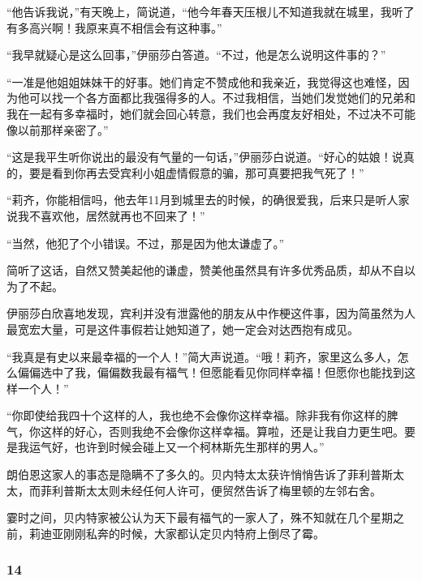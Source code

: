 \par “他告诉我说，”有天晚上，简说道，“他今年春天压根儿不知道我就在城里，我听了有多高兴啊！我原来真不相信会有这种事。”
\par “我早就疑心是这么回事，”伊丽莎白答道。“不过，他是怎么说明这件事的？”
\par “一准是他姐姐妹妹干的好事。她们肯定不赞成他和我亲近，我觉得这也难怪，因为他可以找一个各方面都比我强得多的人。不过我相信，当她们发觉她们的兄弟和我在一起有多幸福时，她们就会回心转意，我们也会再度友好相处，不过决不可能像以前那样亲密了。”
\par “这是我平生听你说出的最没有气量的一句话，”伊丽莎白说道。“好心的姑娘！说真的，要是看到你再去受宾利小姐虚情假意的骗，那可真要把我气死了！”
\par “莉齐，你能相信吗，他去年11月到城里去的时候，的确很爱我，后来只是听人家说我不喜欢他，居然就再也不回来了！”
\par “当然，他犯了个小错误。不过，那是因为他太谦虚了。”
\par 简听了这话，自然又赞美起他的谦虚，赞美他虽然具有许多优秀品质，却从不自以为了不起。
\par 伊丽莎白欣喜地发现，宾利并没有泄露他的朋友从中作梗这件事，因为简虽然为人最宽宏大量，可是这件事假若让她知道了，她一定会对达西抱有成见。
\par “我真是有史以来最幸福的一个人！”简大声说道。“哦！莉齐，家里这么多人，怎么偏偏选中了我，偏偏数我最有福气！但愿能看见你同样幸福！但愿你也能找到这样一个人！”
\par “你即使给我四十个这样的人，我也绝不会像你这样幸福。除非我有你这样的脾气，你这样的好心，否则我绝不会像你这样幸福。算啦，还是让我自力更生吧。要是我运气好，也许到时候会碰上又一个柯林斯先生那样的男人。”
\par 朗伯恩这家人的事态是隐瞒不了多久的。贝内特太太获许悄悄告诉了菲利普斯太太，而菲利普斯太太则未经任何人许可，便贸然告诉了梅里顿的左邻右舍。
\par 霎时之间，贝内特家被公认为天下最有福气的一家人了，殊不知就在几个星期之前，莉迪亚刚刚私奔的时候，大家都认定贝内特府上倒尽了霉。




\subsubsection*{14}


